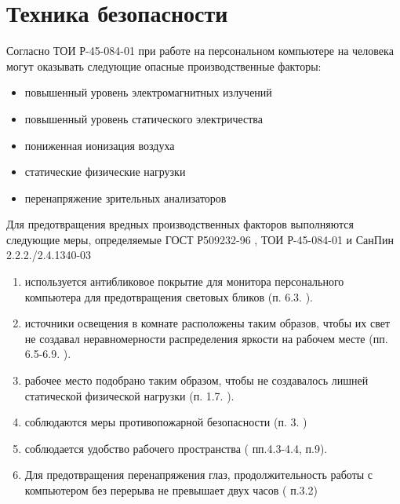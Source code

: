 \documentclass[a4paper,14pt]{extarticle}
\begin{document}
\tableofcontents
\newpage


\newpage

\newpage

\newpage

\newpage

\newpage





\newpage

\appendix
\section{Техника безопасности}
Согласно ТОИ Р-45-084-01  при работе на персональном компьютере на человека
могут оказывать следующие опасные производственные факторы:
\begin{itemize}
    \item повышенный уровень электромагнитных излучений
    \item повышенный уровень статического электричества
    \item пониженная ионизация воздуха
    \item статические физические нагрузки
    \item перенапряжение зрительных анализаторов
\end{itemize}
Для предотвращения вредных производственных факторов выполняются следующие
меры, определяемые ГОСТ Р509232-96 \cite{gost}, ТОИ Р-45-084-01 \cite{toi} и
СанПин 2.2.2./2.4.1340-03 \cite{sanpin}
\begin{enumerate}
    \item используется антибликовое покрытие для монитора персонального
        компьютера для предотвращения световых бликов (п. 6.3. \cite{sanpin}).
    \item источники освещения в комнате расположены таким образов, чтобы их
        свет не создавал неравномерности распределения яркости на рабочем месте
        (пп. 6.5-6.9. \cite{sanpin}).
    \item рабочее место подобрано таким образом, чтобы не создавалось лишней
        статической физической нагрузки (п. 1.7. \cite{toi}).
    \item соблюдаются меры противопожарной безопасности (п. 3. \cite{toi})
    
    \item соблюдается удобство рабочего пространства (\cite{gost} пп.4.3-4.4,
        \cite{sanpin} п.9). 
    \item Для предотвращения перенапряжения глаз, продолжительность работы с компьютером
        без перерыва не превышает двух часов (\cite{toi} п.3.2) 
\end{enumerate}
\end{document}
